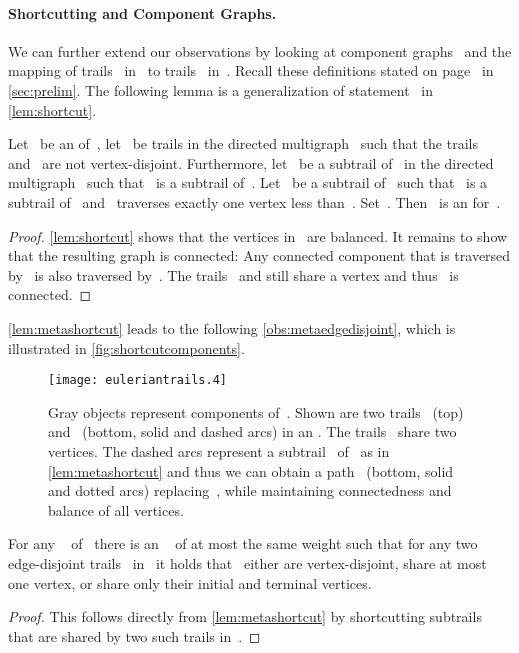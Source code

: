 \paragraph{Shortcutting and Component Graphs.}We can further extend our observations by looking at component graphs~ and the mapping of trails~ in~ to trails~ in~. Recall these definitions stated on page~\pageref{def:meta} in \autoref{sec:prelim}. The following lemma is a generalization of statement~ in \autoref{lem:shortcut}.
\begin{lemma}
  \label{lem:metashortcut}
  Let~ be an \EE{} of~, let~ be trails in the directed multigraph~ such that the trails~ and~ are not vertex-disjoint. Furthermore, let~ be a subtrail of~ in the directed multigraph~ such that~ is a subtrail of~. Let~ be a subtrail of~ such that~ is a subtrail of~ and~ traverses exactly one vertex less than~. Set~. Then~ is an \EE{} for~.
\end{lemma}
\begin{proof}
  \autoref{lem:shortcut} shows that the vertices in~ are balanced. It remains to show that the resulting graph is connected: Any connected component that is traversed by~ is also traversed by~. The trails~ and  still share a vertex and thus~ is connected.
\end{proof}
\autoref{lem:metashortcut} leads to the following \autoref{obs:metaedgedisjoint}, which is illustrated in \autoref{fig:shortcutcomponents}.\begin{figure}
  \begin{center}
    \texttt{[image: euleriantrails.4]}
    \caption{Gray objects represent components of~. Shown are two trails~ (top) and~ (bottom, solid and dashed arcs) in an \EE . The trails~ share two vertices. The dashed arcs represent a subtrail~ of~ as in \autoref{lem:metashortcut} and thus we can obtain a path~ (bottom, solid and dotted arcs) replacing~, while maintaining connectedness and balance of all vertices.}
    \label{fig:shortcutcomponents}
  \end{center}
\end{figure}\begin{observation}
  \label{obs:metaedgedisjoint}
  For any \EE{}~ of~ there is an \EE{}~ of at most the same weight such that for any two edge-disjoint trails~ in~ it holds that~ either are vertex-disjoint, share at most one vertex, or share only their initial and terminal vertices.
\end{observation}
\begin{proof}
This follows directly from \autoref{lem:metashortcut} by shortcutting subtrails that are shared by two such trails in~.
\end{proof}
